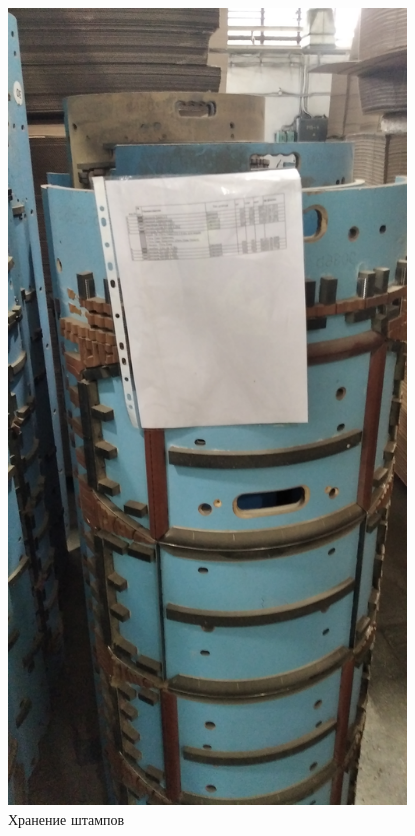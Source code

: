 \begin{figure}
\begin{center}
  \includegraphics[height=0.94\textheight, width=0.94\textwidth, keepaspectratio]{Pics 1/6 хранение штанцев.jpg}
\end{center}
  \caption{Хранение штампов}
  \label{pic:1/6 хранение штанцев}
\end{figure}









